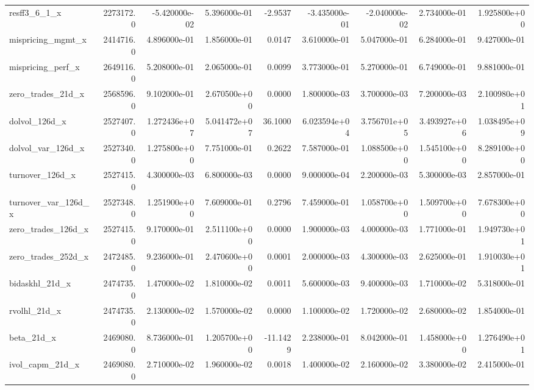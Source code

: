 \documentclass[12pt]{article}
\begin{document}
\begin{landscape}
\begin{longtable}{|l|r|r|r|r|r|r|r|r|}
resff3\_6\_1\_x            &  2273172.0 & -5.420000e-02 &  5.396000e-01 &     -2.9537 & -3.435000e-01 & -2.040000e-02 &  2.734000e-01 &  1.925800e+00 \\
mispricing\_mgmt\_x       &  2414716.0 &  4.896000e-01 &  1.856000e-01 &      0.0147 &  3.610000e-01 &  5.047000e-01 &  6.284000e-01 &  9.427000e-01 \\
mispricing\_perf\_x       &  2649116.0 &  5.208000e-01 &  2.065000e-01 &      0.0099 &  3.773000e-01 &  5.270000e-01 &  6.749000e-01 &  9.881000e-01 \\
zero\_trades\_21d\_x       &  2568596.0 &  9.102000e-01 &  2.670500e+00 &      0.0000 &  1.800000e-03 &  3.700000e-03 &  7.200000e-03 &  2.100980e+01 \\
dolvol\_126d\_x           &  2527407.0 &  1.272436e+07 &  5.041472e+07 &     36.1000 &  6.023594e+04 &  3.756701e+05 &  3.493927e+06 &  1.038495e+09 \\
dolvol\_var\_126d\_x       &  2527340.0 &  1.275800e+00 &  7.751000e-01 &      0.2622 &  7.587000e-01 &  1.088500e+00 &  1.545100e+00 &  8.289100e+00 \\
turnover\_126d\_x         &  2527415.0 &  4.300000e-03 &  6.800000e-03 &      0.0000 &  9.000000e-04 &  2.200000e-03 &  5.300000e-03 &  2.857000e-01 \\
turnover\_var\_126d\_x     &  2527348.0 &  1.251900e+00 &  7.609000e-01 &      0.2796 &  7.459000e-01 &  1.058700e+00 &  1.509700e+00 &  7.678300e+00 \\
zero\_trades\_126d\_x      &  2527415.0 &  9.170000e-01 &  2.511100e+00 &      0.0000 &  1.900000e-03 &  4.000000e-03 &  1.771000e-01 &  1.949730e+01 \\
zero\_trades\_252d\_x      &  2472485.0 &  9.236000e-01 &  2.470600e+00 &      0.0001 &  2.000000e-03 &  4.300000e-03 &  2.625000e-01 &  1.910030e+01 \\
bidaskhl\_21d\_x          &  2474735.0 &  1.470000e-02 &  1.810000e-02 &      0.0011 &  5.600000e-03 &  9.400000e-03 &  1.710000e-02 &  5.318000e-01 \\
rvolhl\_21d\_x            &  2474735.0 &  2.130000e-02 &  1.570000e-02 &      0.0000 &  1.100000e-02 &  1.720000e-02 &  2.680000e-02 &  1.854000e-01 \\
beta\_21d\_x              &  2469080.0 &  8.736000e-01 &  1.205700e+00 &    -11.1429 &  2.238000e-01 &  8.042000e-01 &  1.458000e+00 &  1.276490e+01 \\
ivol\_capm\_21d\_x         &  2469080.0 &  2.710000e-02 &  1.960000e-02 &      0.0018 &  1.400000e-02 &  2.160000e-02 &  3.380000e-02 &  2.415000e-01 \\

\end{longtable}
\end{landscape}
\end{document}
